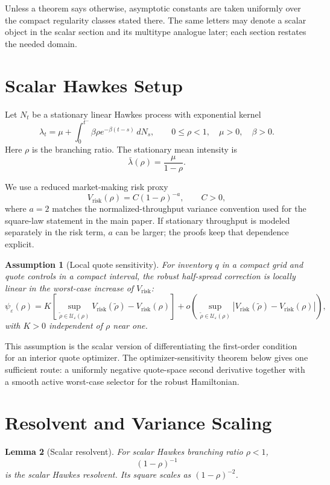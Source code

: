 \documentclass[11pt]{article}
\newtheorem{assumption}{Assumption}
\newtheorem{lemma}[assumption]{Lemma}
\newcommand{\eps}{\varepsilon}
\begin{document}
Unless a theorem says otherwise, asymptotic constants are taken uniformly over
the compact regularity classes stated there. The same letters may denote a
scalar object in the scalar section and its multitype analogue later; each
section restates the needed domain.

\section{Scalar Hawkes Setup}

Let $N_t$ be a stationary linear Hawkes process with exponential kernel
\[
\lambda_t = \mu + \int_0^{t^-}\beta \rho e^{-\beta(t-s)}\,dN_s,
\qquad
0\le \rho < 1,\quad \mu>0,\quad \beta>0.
\]
Here $\rho$ is the branching ratio. The stationary mean intensity is
\[
\bar\lambda(\rho)=\frac{\mu}{1-\rho}.
\]

We use a reduced market-making risk proxy
\[
V_{\mathrm{risk}}(\rho)=C(1-\rho)^{-a},
\qquad C>0,
\]
where $a=2$ matches the normalized-throughput variance convention used for the
square-law statement in the main paper. If stationary throughput is modeled
separately in the risk term, $a$ can be larger; the proofs keep that dependence
explicit.

\begin{assumption}[Local quote sensitivity]
For inventory $q$ in a compact grid and quote controls in a compact interval,
the robust half-spread correction is locally linear in the worst-case increase
of $V_{\mathrm{risk}}$:
\[
\psi_\eps(\rho)
=K\left[\sup_{\tilde\rho\in\mathcal U_\eps(\rho)}
V_{\mathrm{risk}}(\tilde\rho)-V_{\mathrm{risk}}(\rho)\right]
+o\left(\sup_{\tilde\rho\in\mathcal U_\eps(\rho)}
|V_{\mathrm{risk}}(\tilde\rho)-V_{\mathrm{risk}}(\rho)|\right),
\]
with $K>0$ independent of $\rho$ near one.
\end{assumption}

This assumption is the scalar version of differentiating the first-order
condition for an interior quote optimizer. The optimizer-sensitivity theorem
below gives one sufficient route: a uniformly negative quote-space second
derivative together with a smooth active worst-case selector for the robust
Hamiltonian.

\section{Resolvent and Variance Scaling}

\begin{lemma}[Scalar resolvent]
For scalar Hawkes branching ratio $\rho<1$,
\[
(1-\rho)^{-1}
\]
is the scalar Hawkes resolvent. Its square scales as $(1-\rho)^{-2}$.
\end{lemma}
\end{document}
